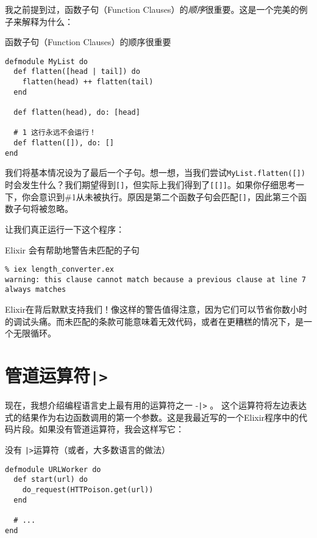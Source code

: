 我之前提到过，函数子句（Function Clauses）的\emph{顺序}很重要。这是一个完美的例子来解释为什么：

\begin{code}{函数子句（Function Clauses）的顺序很重要}
\begin{verbatim}
defmodule MyList do
  def flatten([head | tail]) do
    flatten(head) ++ flatten(tail)
  end

  def flatten(head), do: [head]

  # 1 这行永远不会运行！
  def flatten([]), do: []
end
\end{verbatim}
\label{lst:the_order_of_function_clauses_is_important}
\end{code}

我们将基本情况设为了最后一个子句。想一想，当我们尝试\texttt{MyList.flatten([])}时会发生什么？我们期望得到\texttt{[]}，但实际上我们得到了\texttt{[[]]}。如果你仔细思考一下，你会意识到\#1从未被执行。原因是第二个函数子句会匹配\texttt{[]}，因此第三个函数子句将被忽略。

让我们真正运行一下这个程序：


\begin{code}{Elixir 会有帮助地警告未匹配的子句}
\begin{verbatim}
% iex length_converter.ex
warning: this clause cannot match because a previous clause at line 7 always matches
\end{verbatim}
\label{lst:elixir_will_helpfully_warn_about_unmatched_clauses}
\end{code}

Elixir在背后默默支持我们！像这样的警告值得注意，因为它们可以节省你数小时的调试头痛。而未匹配的条款可能意味着无效代码，或者在更糟糕的情况下，是一个无限循环。

\section{管道运算符\texttt{|>}}

现在，我想介绍编程语言史上最有用的运算符之一 -\texttt{|>} 。
这个运算符将左边表达式的结果作为右边函数调用的第一个参数。这是我最近写的一个Elixir程序中的代码片段。如果没有管道运算符，我会这样写它：

\begin{code}{没有 \texttt{|>}运算符（或者，大多数语言的做法）}
\begin{verbatim}
defmodule URLWorker do
  def start(url) do
    do_request(HTTPoison.get(url))
  end

  # ...
end
\end{verbatim}
\label{lst:without_the_pipe_operator_or_the_way_most_languages_do_it}
\end{code}

